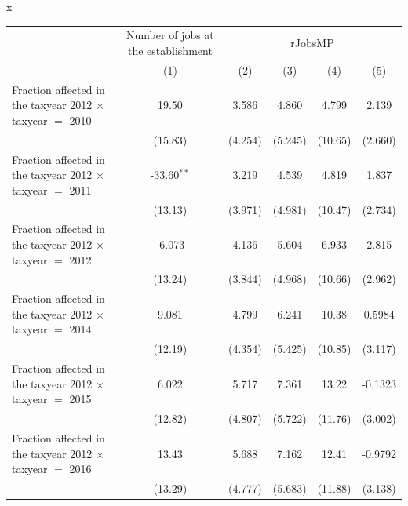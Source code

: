 x
\begingroup
\centering
\begin{tabular}{lccccc}
   \toprule
    & Number of jobs at the establishment & \multicolumn{4}{c}{rJobsMP}\\
                                                                    & (1)           & (2)           & (3)           & (4)           & (5)\\  
   \midrule 
   Fraction affected in the taxyear 2012 $\times$ taxyear $=$ 2010  & 19.50         & 3.586         & 4.860         & 4.799         & 2.139\\   
                                                                    & (15.83)       & (4.254)       & (5.245)       & (10.65)       & (2.660)\\   
   Fraction affected in the taxyear 2012 $\times$ taxyear $=$ 2011  & -33.60$^{**}$ & 3.219         & 4.539         & 4.819         & 1.837\\   
                                                                    & (13.13)       & (3.971)       & (4.981)       & (10.47)       & (2.734)\\   
   Fraction affected in the taxyear 2012 $\times$ taxyear $=$ 2012  & -6.073        & 4.136         & 5.604         & 6.933         & 2.815\\   
                                                                    & (13.24)       & (3.844)       & (4.968)       & (10.66)       & (2.962)\\   
   Fraction affected in the taxyear 2012 $\times$ taxyear $=$ 2014  & 9.081         & 4.799         & 6.241         & 10.38         & 0.5984\\   
                                                                    & (12.19)       & (4.354)       & (5.425)       & (10.85)       & (3.117)\\   
   Fraction affected in the taxyear 2012 $\times$ taxyear $=$ 2015  & 6.022         & 5.717         & 7.361         & 13.22         & -0.1323\\   
                                                                    & (12.82)       & (4.807)       & (5.722)       & (11.76)       & (3.002)\\   
   Fraction affected in the taxyear 2012 $\times$ taxyear $=$ 2016  & 13.43         & 5.688         & 7.162         & 12.41         & -0.9792\\   
                                                                    & (13.29)       & (4.777)       & (5.683)       & (11.88)       & (3.138)\\   

\end{tabular}
